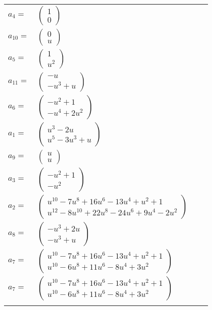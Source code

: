 \documentclass[1p]{elsarticle_modified}
\theoremstyle{definition}
\begin{document}
\begin{tabular}{m{7pt} m{180pt} m{7pt} m{180pt} }
\flushright $a_{4}=$&$\begin{pmatrix}1\\0\end{pmatrix}$ \\
\flushright $a_{10}=$&$\begin{pmatrix}0\\u\end{pmatrix}$ \\
\flushright $a_{5}=$&$\begin{pmatrix}1\\u^2\end{pmatrix}$ \\
\flushright $a_{11}=$&$\begin{pmatrix}- u\\- u^3+u\end{pmatrix}$ \\
\flushright $a_{6}=$&$\begin{pmatrix}- u^2+1\\- u^4+2 u^2\end{pmatrix}$ \\
\flushright $a_{1}=$&$\begin{pmatrix}u^3-2 u\\u^5-3 u^3+u\end{pmatrix}$ \\
\flushright $a_{9}=$&$\begin{pmatrix}u\\u\end{pmatrix}$ \\
\flushright $a_{3}=$&$\begin{pmatrix}- u^2+1\\- u^2\end{pmatrix}$ \\
\flushright $a_{2}=$&$\begin{pmatrix}u^{10}-7 u^8+16 u^6-13 u^4+u^2+1\\u^{12}-8 u^{10}+22 u^8-24 u^6+9 u^4-2 u^2\end{pmatrix}$ \\
\flushright $a_{8}=$&$\begin{pmatrix}- u^3+2 u\\- u^3+u\end{pmatrix}$ \\
\flushright $a_{7}=$&$\begin{pmatrix}u^{10}-7 u^8+16 u^6-13 u^4+u^2+1\\u^{10}-6 u^8+11 u^6-8 u^4+3 u^2\end{pmatrix}$\\ \flushright $a_{7}=$&$\begin{pmatrix}u^{10}-7 u^8+16 u^6-13 u^4+u^2+1\\u^{10}-6 u^8+11 u^6-8 u^4+3 u^2\end{pmatrix}$\\&\end{tabular}
\end{document}
